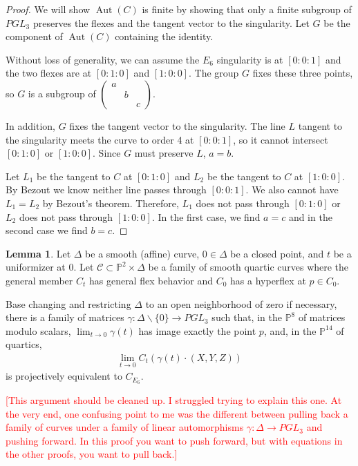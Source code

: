 \documentclass{article}
\newcommand{\rood}[1]{\textcolor{red}{[#1]}}
\theoremstyle{definition}
\newtheorem{lem}[thm]{Lemma}
\newcommand{\on}{\operatorname}
\newcommand{\mb}{\mathbb}
\newcommand{\mc}{\mathcal}
\begin{document}
\begin{proof}
We will show $\on{Aut}(C)$ is finite by showing that only a finite subgroup of $PGL_3$ preserves the flexes and the tangent vector to the singularity. Let $G$ be the component of $\on{Aut}(C)$ containing the identity. 

Without loss of generality, we can assume the $E_6$ singularity is at $[0:0:1]$ and the two flexes are at $[0:1:0]$ and $[1:0:0]$. The group $G$ fixes these three points, so $G$ is a subgroup of $\begin{pmatrix} a & & \\ & b & \\ & & c\end{pmatrix}$.

In addition, $G$ fixes the tangent vector to the singularity. The line $L$ tangent to the singularity meets the curve to order 4 at $[0:0:1]$, so it cannot intersect $[0:1:0]$ or $[1:0:0]$. Since $G$ must preserve $L$, $a=b$. 

Let $L_1$ be the tangent to $C$ at $[0:1:0]$ and $L_2$ be the tangent to $C$ at $[1:0:0]$. By Bezout we know neither line passes through $[0:0:1]$. We also cannot have $L_1=L_2$ by Bezout's theorem. Therefore, $L_1$ does not pass through $[0:1:0]$ or $L_2$ does not pass through $[1:0:0]$. In the first case, we find $a=c$ and in the second case we find $b=c$.
\end{proof}

\begin{lem}
\label{hyperflex}
Let $\Delta$ be a smooth (affine) curve, $0\in \Delta$ be a closed point, and $t$ be a uniformizer at $0$. Let $\mc{C}\subset \mb{P}^2\times \Delta$ be a family of smooth quartic curves where the general member $C_t$ has general flex behavior and $C_0$ has a hyperflex at $p\in C_0$. 

Base changing and restricting $\Delta$ to an open neighborhood of zero if necessary, there is a family of matrices $\gamma: \Delta\backslash\{0\}\to PGL_3$ such that, in the $\mb{P}^8$ of matrices modulo scalars, $\lim_{t\to 0}\gamma(t)$ has image exactly the point $p$, and, in the $\mb{P}^{14}$ of quartics,
\begin{align*}
    \lim_{t\to 0}C_t(\gamma(t)\cdot (X,Y,Z))
\end{align*}
is projectively equivalent to $C_{E_6}$.
\end{lem}

\rood{This argument should be cleaned up. I struggled trying to explain this one. At the very end, one confusing point to me was the different between pulling back a family of curves under a family of linear automorphisms $\gamma:\Delta\to PGL_3$ and pushing forward. In this proof you want to push forward, but with equations in the other proofs, you want to pull back.}
\end{document}
